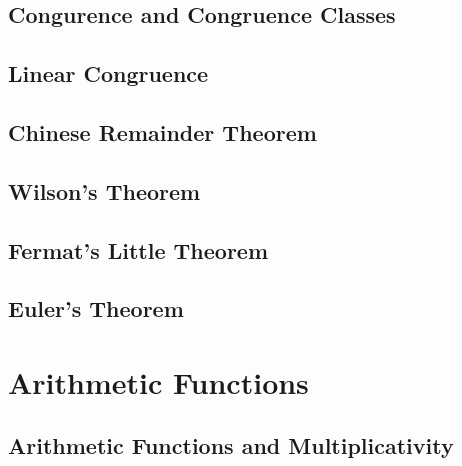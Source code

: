 \documentclass{book}
\begin{document}
\chapter{Congurence and Congruence Classes}


\chapter{Linear Congruence}


\chapter{Chinese Remainder Theorem}


\chapter{Wilson's Theorem}


\chapter{Fermat's Little Theorem}


\chapter{Euler's Theorem}


\part{Arithmetic Functions}

\chapter{Arithmetic Functions and Multiplicativity}


\backmatter




\printindex
\end{document}
